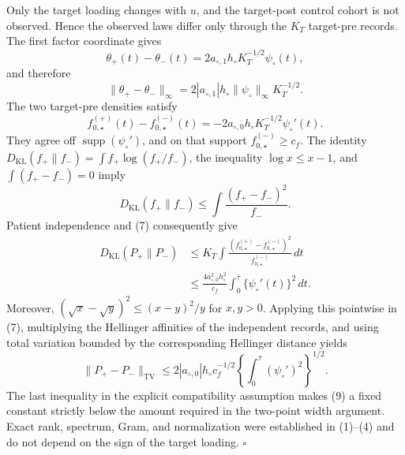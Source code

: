 Only the target loading changes with \(u\), and the target-post control
cohort is not observed.  Hence the observed laws differ only through the
\(K_T\) target-pre records.  The first factor coordinate gives
\[
 \theta_+(t)-\theta_-(t)
 =2a_{\circ,1}h_\circ K_T^{-1/2}\psi_\circ(t),               \tag{5}
\]
and therefore
\[
 \|\theta_+-\theta_-\|_\infty
 =2|a_{\circ,1}|h_\circ\|\psi_\circ\|_\infty K_T^{-1/2}.    \tag{6}
\]
The two target-pre densities satisfy
\[
 f_{0,\star}^{(+)}(t)-f_{0,\star}^{(-)}(t)
 =-2a_{\circ,0}h_\circ K_T^{-1/2}\psi_\circ'(t).             \tag{7}
\]
They agree off \(\operatorname{supp}(\psi_\circ')\), and on that support
\(f_{0,\star}^{(-)}\ge c_f\).  The identity
\(D_{\mathrm{KL}}(f_+\|f_-)=\int f_+\log(f_+/f_-)\), the inequality
\(\log x\le x-1\), and \(\int(f_+-f_-)=0\) imply
\[
 D_{\mathrm{KL}}(f_+\|f_-)
 \le\int\frac{(f_+-f_-)^2}{f_-}.
\]
Patient independence and (7) consequently give
\[
 \begin{split}
 D_{\mathrm{KL}}(P_+\|P_-)
 &\le K_T\int\frac{(f_{0,\star}^{(+)}-f_{0,\star}^{(-)})^2}
                         {f_{0,\star}^{(-)}}\,dt\\
 &\le\frac{4a_{\circ,0}^2h_\circ^2}{c_f}
       \int_0^{\bar\tau}\{\psi_\circ'(t)\}^2\,dt.           \tag{8}
 \end{split}
\]
Moreover,
\((\sqrt{x}-\sqrt y)^2\le(x-y)^2/y\) for \(x,y>0\).  Applying this
pointwise in (7), multiplying the Hellinger affinities of the independent
records, and using total variation bounded by the corresponding Hellinger
distance yields
\[
 \|P_+-P_-\|_{\mathrm{TV}}
 \le2|a_{\circ,0}|h_\circ c_f^{-1/2}
       \left\{\int_0^{\bar\tau}(\psi_\circ')^2\right\}^{1/2}. \tag{9}
\]
The last inequality in the explicit compatibility assumption makes (9) a
fixed constant strictly below the amount required in the two-point width
argument.  Exact rank, spectrum, Gram, and normalization were established
in (1)--(4) and do not depend on the sign of the target loading. \(\square\)